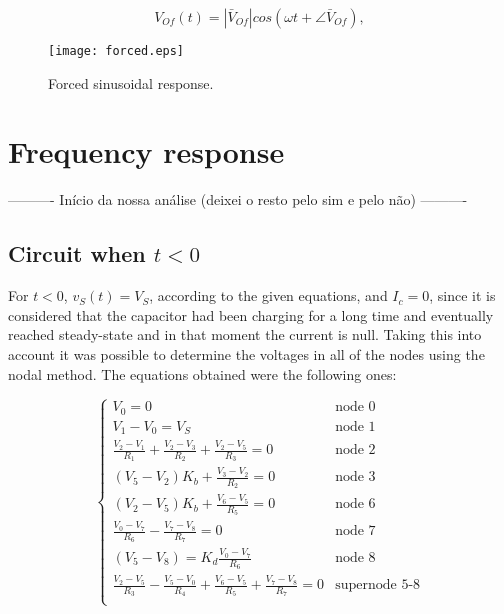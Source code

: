 \begin{equation}
  V_{Of}(t) = |\bar{V}_{Of}| cos(\omega t + \angle \bar{V}_{Of}),
  \label{eq:vo_for}
\end{equation}

\lipsum[1-1]


\begin{figure}[h] \centering
\texttt{[image: forced.eps]}
\caption{Forced sinusoidal response.}
\label{fig:forced}
\end{figure}


\section{Frequency response}








---------- Início da nossa análise (deixei o resto pelo sim e pelo não) ----------




\subsection{Circuit when $t<0$} %
For $t<0$, $v_S(t) = V_S$, according to the given equations, and $I_c=0$, since it is considered that the capacitor had been charging for a long time and eventually reached steady-state and in that moment the current is null. Taking this into account it was possible to determine the voltages in all of the nodes using the nodal method. The equations obtained were the following ones:


\begin{equation}
  \begin{cases}
  V_0 = 0 & \mbox{node 0}\\
  V_1-V_0 = V_S & \mbox{node 1} \\
  \frac{V_2-V_1}{R_1}+\frac{V_2-V_3}{R_2}+\frac{V_2-V_5}{R_3} = 0 & \mbox{node 2} \\
  (V_5-V_2)K_b + \frac{V_3-V_2}{R_2} = 0 & \mbox{node 3} \\
  (V_2-V_5)K_b + \frac{V_6-V_5}{R_5} = 0 & \mbox{node 6} \\
  \frac{V_0-V_7}{R_6} - \frac{V_7-V_8}{R_7} = 0 & \mbox{node 7} \\
  (V_5-V_8) = K_d \frac{V_0-V_7}{R_6} & \mbox{node 8} \\
  \frac{V_2-V_5}{R_3} - \frac{V_5-V_0}{R_4} + \frac{V_6-V_5}{R_5} + \frac{V_7-V_8}{R_7}  = 0 & \mbox{supernode 5-8} \\ 
  \end{cases}
\end{equation}

